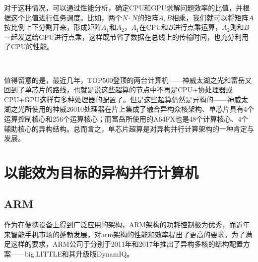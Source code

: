 \documentclass[UTF8,a4paper,10pt]{ctexart}
\newcommand{\xiaosi}{\fontsize{12pt}{18pt}\selectfont}            %
\begin{document}
对于这种情况，可以通过性能分析，确定CPU和GPU求解问题效率的比值，并根据这个比值进行任务调度。比如，两个$N\cdot N$的矩阵$A, B$相乘，我们就可以将矩阵$A$按比例上下分割开来，形成矩阵$A_{1}$和$A_{2}$，$A_{1}$在CPU和$B$进行点乘运算，$A_{2}$则和$B$一起发送给GPU进行点乘，这样既节省了数据在总线上的传输时间，也充分利用了CPU的性能。\cite{gpu_martix}

~


值得留意的是，最近几年，TOP500登顶的两台计算机——神威太湖之光和富岳又回到了单芯片的路线，也就是说这些超算的节点中不再是CPU+协处理器或CPU+GPU这样有多种处理器的配置了。但是这些超算仍然是异构的——神威太湖之光所使用的神威26010处理器在片上集成了融合异构众核架构、单芯片具有4个运算控制核心和256个运算核心；而富岳所使用的A64FX也是48个计算核心、4个辅助核心的异构结构。总而言之，单芯片超算是对异构并行计算架构的一种肯定与发展。\cite{sw26010}\cite{a64fx}

    






\section{以能效为目标的异构并行计算机}
\subsection{ARM}
作为在便携设备上得到广泛应用的架构，ARM架构的功耗控制极为优秀，而近年来智能手机市场的蓬勃发展，对arm架构的性能和效率提出了更高的要求。为了满足这样的要求，ARM公司于分别于2011年和2017年推出了异构多核的结构配置方案——big.LITTLE和其升级版DynamIQ。
\end{document}
